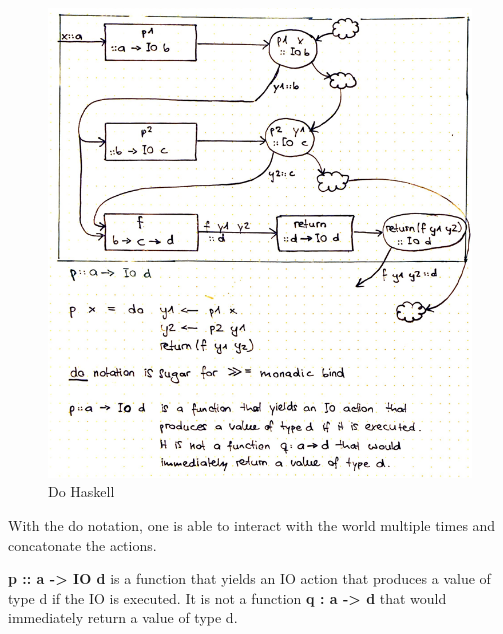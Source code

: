 \begin{figure}[H]
\centering
\includegraphics[width=1\textwidth]{figures/doHaskell.png}
\caption{Do Haskell}
\end{figure}

With the do notation, one is able to interact with the world multiple
times and concatonate the actions.

\textbf{p :: a -\textgreater{} IO d} is a function that yields an IO
action that produces a value of type d if the IO is executed. It is not
a function \textbf{q : a -\textgreater{} d} that would immediately
return a value of type d.

\clearpage